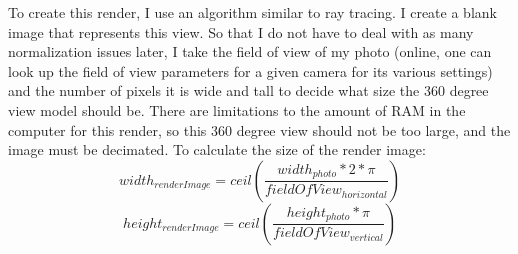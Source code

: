 \documentclass{acm_proc_article-sp}
\begin{document}
To create this render, I use an algorithm similar to ray tracing.  I create a blank image that represents this view.  So that I do not have to deal with as many normalization issues later, I take the field of view of my photo (online, one can look up the field of view parameters for a given camera for its various settings) and the number of pixels it is wide and tall to decide what size the 360 degree view model should be.  There are limitations to the amount of RAM in the computer for this render, so this 360 degree view should not be too large, and the image must be decimated.  To calculate the size of the render image:
\begin{equation}
width_{renderImage} = ceil(\frac{width_{photo}*2*\pi}{fieldOfView_{horizontal}})
\end{equation}
\begin{equation}
height_{renderImage} = ceil(\frac{height_{photo}*\pi}{fieldOfView_{vertical}})
\end{equation}
\end{document}
